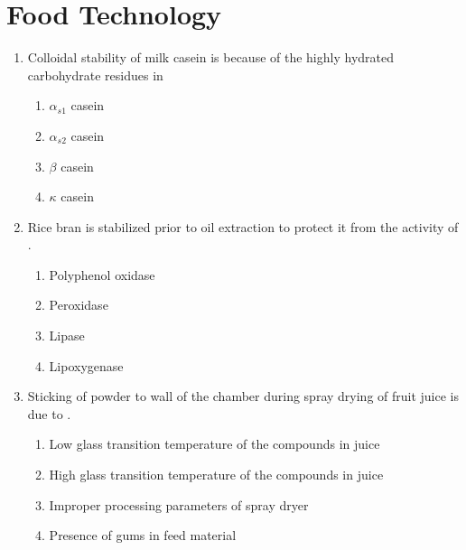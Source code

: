 \documentclass[journal,12pt,onecolumn]{IEEEtran}
\begin{document}
\section*{Food Technology}
\noindent
\vspace{1cm}
\begin{enumerate}[label=\arabic*)]

\item Colloidal stability of milk casein is because of the highly hydrated carbohydrate residues in
\hfill{} \\

\vspace{0.2cm}
\begin{enumerate}[label=\alph*)]
\item $\alpha_{s1}$ casein
\item $\alpha_{s2}$ casein
\item $\beta$ casein
\item $\kappa$ casein
\end{enumerate}

\vspace{0.5cm}

\item Rice bran is stabilized prior to oil extraction to protect it from the activity of \underline{\hspace{2cm}}.
\hfill{} \\

\vspace{0.2cm}
\begin{enumerate}[label=\alph*)]
\item Polyphenol oxidase
\item Peroxidase
\item Lipase
\item Lipoxygenase
\end{enumerate}

\vspace{0.5cm}

\item Sticking of powder to wall of the chamber during spray drying of fruit juice is due to \underline{\hspace{2cm}}.
\vspace{0.05cm}
\hfill{} \\

\vspace{0.2cm}
\begin{enumerate}[label=\alph*)]
\item Low glass transition temperature of the compounds in juice
\item High glass transition temperature of the compounds in juice
\item Improper processing parameters of spray dryer
\item Presence of gums in feed material
\end{enumerate}


\end{enumerate}
\end{document}

